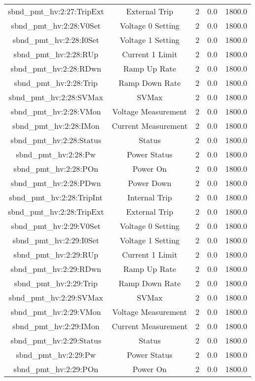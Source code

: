 \begin{table}[ptb]
\begin{tabular}{c | c c c c}
sbnd_pmt_hv:2:27:TripExt & External Trip & 2 & 0.0 & 1800.0\\ 
sbnd_pmt_hv:2:28:V0Set & Voltage 0 Setting & 2 & 0.0 & 1800.0\\ 
sbnd_pmt_hv:2:28:I0Set & Voltage 1 Setting & 2 & 0.0 & 1800.0\\ 
sbnd_pmt_hv:2:28:RUp & Current 1 Limit & 2 & 0.0 & 1800.0\\ 
sbnd_pmt_hv:2:28:RDwn & Ramp Up Rate & 2 & 0.0 & 1800.0\\ 
sbnd_pmt_hv:2:28:Trip & Ramp Down Rate & 2 & 0.0 & 1800.0\\ 
sbnd_pmt_hv:2:28:SVMax & SVMax & 2 & 0.0 & 1800.0\\ 
sbnd_pmt_hv:2:28:VMon & Voltage Measurement & 2 & 0.0 & 1800.0\\ 
sbnd_pmt_hv:2:28:IMon & Current Measurement & 2 & 0.0 & 1800.0\\ 
sbnd_pmt_hv:2:28:Status & Status & 2 & 0.0 & 1800.0\\ 
sbnd_pmt_hv:2:28:Pw & Power Status & 2 & 0.0 & 1800.0\\ 
sbnd_pmt_hv:2:28:POn & Power On & 2 & 0.0 & 1800.0\\ 
sbnd_pmt_hv:2:28:PDwn & Power Down & 2 & 0.0 & 1800.0\\ 
sbnd_pmt_hv:2:28:TripInt & Internal Trip & 2 & 0.0 & 1800.0\\ 
sbnd_pmt_hv:2:28:TripExt & External Trip & 2 & 0.0 & 1800.0\\ 
sbnd_pmt_hv:2:29:V0Set & Voltage 0 Setting & 2 & 0.0 & 1800.0\\ 
sbnd_pmt_hv:2:29:I0Set & Voltage 1 Setting & 2 & 0.0 & 1800.0\\ 
sbnd_pmt_hv:2:29:RUp & Current 1 Limit & 2 & 0.0 & 1800.0\\ 
sbnd_pmt_hv:2:29:RDwn & Ramp Up Rate & 2 & 0.0 & 1800.0\\ 
sbnd_pmt_hv:2:29:Trip & Ramp Down Rate & 2 & 0.0 & 1800.0\\ 
sbnd_pmt_hv:2:29:SVMax & SVMax & 2 & 0.0 & 1800.0\\ 
sbnd_pmt_hv:2:29:VMon & Voltage Measurement & 2 & 0.0 & 1800.0\\ 
sbnd_pmt_hv:2:29:IMon & Current Measurement & 2 & 0.0 & 1800.0\\ 
sbnd_pmt_hv:2:29:Status & Status & 2 & 0.0 & 1800.0\\ 
sbnd_pmt_hv:2:29:Pw & Power Status & 2 & 0.0 & 1800.0\\ 
sbnd_pmt_hv:2:29:POn & Power On & 2 & 0.0 & 1800.0\\ 

\end{tabular}
\end{table}
